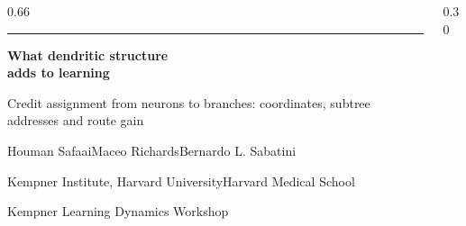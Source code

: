 

\begin{frame}
  \begin{columns}[c,onlytextwidth]
    \begin{column}{0.66\textwidth}
      {\color{Shunt}\rule{1.15cm}{1.6pt}}\par
      \vspace{0.34cm}
      {\fontsize{26}{31}\selectfont\bfseries What dendritic structure\\[0.06cm]adds to learning\par}
      \vspace{0.34cm}
      {\normalsize\color{Mute}Credit assignment from neurons to branches: coordinates, subtree addresses and route gain\par}
      \vspace{0.60cm}
      {\small Houman Safaai\enspace\textperiodcentered\enspace Maceo Richards\enspace\textperiodcentered\enspace Bernardo L. Sabatini\par}
      \vspace{0.10cm}
      {\footnotesize\color{Mute}Kempner Institute, Harvard University\enspace\textperiodcentered\enspace Harvard Medical School\par}
      \vspace{0.30cm}
      {\footnotesize\color{Mute}Kempner Learning Dynamics Workshop\enspace\textperiodcentered{}\par}
    \end{column}
    \begin{column}{0.30\textwidth}
      \centering
      \dendtree[1.62]
    \end{column}
  \end{columns}
\end{frame}

